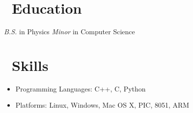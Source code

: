 \documentclass{resume}
\begin{document}
\section{\faGraduationCap\ Education}
\textit{B.S.} in Physics
\newline
\textit{Minor} in Computer Science

\section{\faCogs\ Skills}
\begin{itemize}[parsep=0.5ex]
  \item Programming Languages: C++, C, Python
  \item Platforms: Linux, Windows, Mac OS X, PIC, 8051, ARM
\end{itemize}
\end{document}
